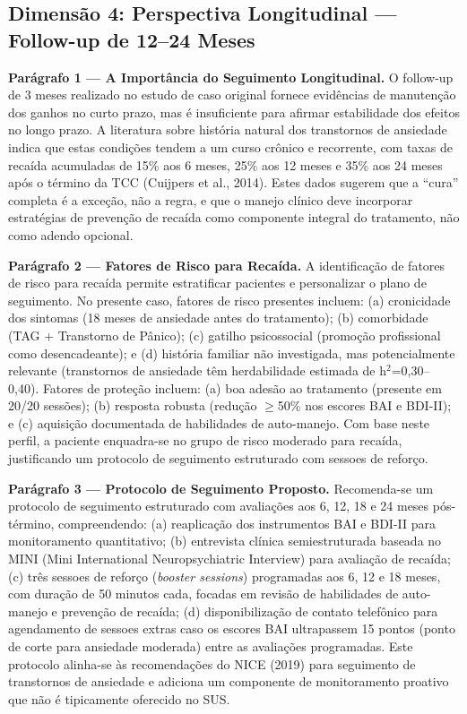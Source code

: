 \documentclass[12pt,a4paper]{article}
\begin{document}
\subsection{Dimensão 4: Perspectiva Longitudinal — Follow-up de 12--24 Meses}

\textbf{Parágrafo 1 — A Importância do Seguimento Longitudinal.} O follow-up de 3 meses realizado no estudo de caso original fornece evidências de manutenção dos ganhos no curto prazo, mas é insuficiente para afirmar estabilidade dos efeitos no longo prazo. A literatura sobre história natural dos transtornos de ansiedade indica que estas condições tendem a um curso crônico e recorrente, com taxas de recaída acumuladas de 15\% aos 6 meses, 25\% aos 12 meses e 35\% aos 24 meses após o término da TCC (Cuijpers et al., 2014). Estes dados sugerem que a ``cura'' completa é a exceção, não a regra, e que o manejo clínico deve incorporar estratégias de prevenção de recaída como componente integral do tratamento, não como adendo opcional.

\textbf{Parágrafo 2 — Fatores de Risco para Recaída.} A identificação de fatores de risco para recaída permite estratificar pacientes e personalizar o plano de seguimento. No presente caso, fatores de risco presentes incluem: (a) cronicidade dos sintomas (18 meses de ansiedade antes do tratamento); (b) comorbidade (TAG + Transtorno de Pânico); (c) gatilho psicossocial (promoção profissional como desencadeante); e (d) história familiar não investigada, mas potencialmente relevante (transtornos de ansiedade têm herdabilidade estimada de h$^{2}$=0,30--0,40). Fatores de proteção incluem: (a) boa adesão ao tratamento (presente em 20/20 sessões); (b) resposta robusta (redução $\geq$50\% nos escores BAI e BDI-II); e (c) aquisição documentada de habilidades de auto-manejo. Com base neste perfil, a paciente enquadra-se no grupo de risco moderado para recaída, justificando um protocolo de seguimento estruturado com sessoes de reforço.

\textbf{Parágrafo 3 — Protocolo de Seguimento Proposto.} Recomenda-se um protocolo de seguimento estruturado com avaliações aos 6, 12, 18 e 24 meses pós-término, compreendendo: (a) reaplicação dos instrumentos BAI e BDI-II para monitoramento quantitativo; (b) entrevista clínica semiestruturada baseada no MINI (Mini International Neuropsychiatric Interview) para avaliação de recaída; (c) três sessoes de reforço (\textit{booster sessions}) programadas aos 6, 12 e 18 meses, com duração de 50 minutos cada, focadas em revisão de habilidades de auto-manejo e prevenção de recaída; (d) disponibilização de contato telefônico para agendamento de sessoes extras caso os escores BAI ultrapassem 15 pontos (ponto de corte para ansiedade moderada) entre as avaliações programadas. Este protocolo alinha-se às recomendações do NICE (2019) para seguimento de transtornos de ansiedade e adiciona um componente de monitoramento proativo que não é tipicamente oferecido no SUS.
\end{document}
